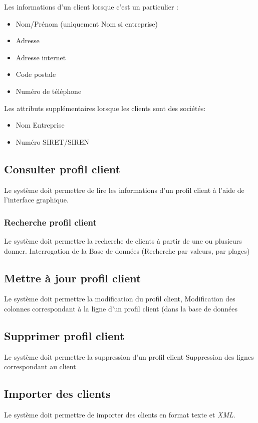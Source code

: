 \documentclass{article}
\begin{document}
    Les informations d'un client lorsque c'est un particulier :
    \begin{itemize}[leftmargin=0.55in]
        \item Nom/Prénom (uniquement Nom si entreprise)
        \item Adresse
        \item Adresse internet
        \item Code postale
        \item Numéro de téléphone
    \end{itemize}
    
    Les attributs supplémentaires lorsque les clients sont des sociétés:
    \begin{itemize}[leftmargin=0.55in]
        \item Nom Entreprise
        \item Numéro SIRET/SIREN
    \end{itemize}
    
    \subsection{Consulter profil client}
    Le système doit permettre de lire les informations d'un profil client à l'aide de l'interface graphique.
    
    \subsubsection{Recherche profil client}
    Le système doit permettre la recherche de clients à partir de une ou plusieurs donner.
    Interrogation de la Base de données (Recherche par valeurs, par plages)
    
    \subsection{Mettre à jour profil client}
    Le système doit permettre la modification du profil client,
    Modification des colonnes correspondant à la ligne d'un profil client (dans la base de données
    
    \subsection{Supprimer profil client}
    Le système doit permettre la suppression d'un profil client
    Suppression des lignes correspondant au client
    
    \subsection{Importer des clients}
    Le système doit permettre de importer des clients en format texte et \emph{XML}.
    
\end{document}
